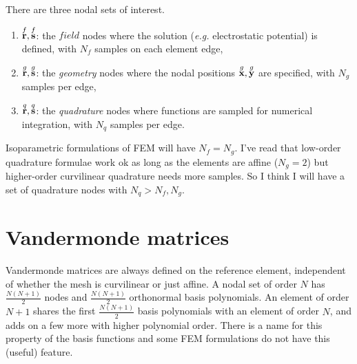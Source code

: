 There are three nodal sets of interest.
%
\begin{enumerate}
  \item $\overset{f}{\textbf{r}}, \overset{f}{\textbf{s}}$: the $field$ nodes where the solution (\emph{e.g.} electrostatic potential) is defined, with $N_f$ samples on each element edge,
  \item $\overset{g}{\textbf{r}}, \overset{g}{\textbf{s}}$: the \emph{geometry} nodes where the nodal positions $\overset{g}{\textbf{x}}, \overset{g}{\textbf{y}}$ are specified, with $N_g$ samples per edge,
  \item $\overset{q}{\textbf{r}}, \overset{q}{\textbf{s}}$: the \emph{quadrature} nodes where functions are sampled for numerical integration, with $N_q$ samples per edge.
\end{enumerate}
%
Isoparametric formulations of FEM will have $N_f = N_g$.  I've read that low-order quadrature formulae work ok as long as the elements are affine ($N_g = 2$) but higher-order curvilinear quadrature needs more samples.  So I think I will have a set of quadrature nodes with $N_q > N_f, N_g$.

\section{Vandermonde matrices}

Vandermonde matrices are always defined on the reference element, independent of whether the mesh is curvilinear or just affine.  A nodal set of order $N$ has $\frac{N(N+1)}{2}$ nodes and $\frac{N(N+1)}{2}$ orthonormal basis polynomials.  An element of order $N+1$ shares the first $\frac{N(N+1)}{2}$ basis polynomials with an element of order $N$, and adds on a few more with higher polynomial order.  There is a name for this property of the basis functions and some FEM formulations do not have this (useful) feature.

